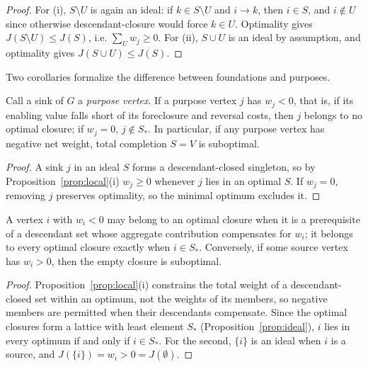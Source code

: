 \begin{proof}
For (i), $S\setminus U$ is again an ideal: if $k\in S\setminus U$ and $i\to k$, then $i\in S$, and $i\notin U$ since otherwise descendant-closure would force $k\in U$. Optimality gives $J(S\setminus U)\leq J(S)$, i.e. $\sum_{U}w_j\geq 0$. For (ii), $S\cup U$ is an ideal by assumption, and optimality gives $J(S\cup U)\leq J(S)$.
\end{proof}

Two corollaries formalize the difference between foundations and purposes.

\begin{corollary}\label{cor:purposes}
Call a sink of $G$ a \emph{purpose vertex}. If a purpose vertex $j$ has $w_j<0$, that is, if its enabling value falls short of its foreclosure and reversal costs, then $j$ belongs to no optimal closure; if $w_j=0$, $j\notin S_\ast$. In particular, if any purpose vertex has negative net weight, total completion $S=V$ is suboptimal.
\end{corollary}

\begin{proof}
A sink $j$ in an ideal $S$ forms a descendant-closed singleton, so by Proposition~\ref{prop:local}(i) $w_j\geq 0$ whenever $j$ lies in an optimal $S$. If $w_j=0$, removing $j$ preserves optimality, so the minimal optimum excludes it.
\end{proof}

\begin{corollary}\label{cor:foundations}
A vertex $i$ with $w_i<0$ may belong to an optimal closure when it is a prerequisite of a descendant set whose aggregate contribution compensates for $w_i$; it belongs to every optimal closure exactly when $i\in S_\ast$. Conversely, if some source vertex has $w_i>0$, then the empty closure is suboptimal.
\end{corollary}

\begin{proof}
Proposition~\ref{prop:local}(i) constrains the total weight of a descendant-closed set within an optimum, not the weights of its members, so negative members are permitted when their descendants compensate. Since the optimal closures form a lattice with least element $S_\ast$ (Proposition~\ref{prop:ideal}), $i$ lies in every optimum if and only if $i\in S_\ast$. For the second, $\{i\}$ is an ideal when $i$ is a source, and $J(\{i\})=w_i>0=J(\emptyset)$.
\end{proof}

